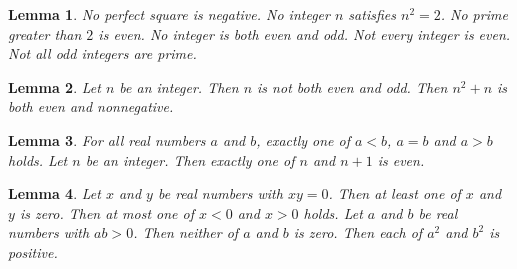 \documentclass{article}
\newtheorem{lemma}{Lemma}
\begin{document}
\begin{lemma}\label{no-and-not-every}
No perfect square is negative. No integer $n$ satisfies $n^2=2$. No prime greater than $2$ is even. No integer is both even and odd. Not every integer is even. Not all odd integers are prime.
\end{lemma}

\begin{lemma}\label{both-and-not-both}
Let $n$ be an integer. Then $n$ is not both even and odd. Then $n^2+n$ is both even and nonnegative.
\end{lemma}

\begin{lemma}\label{how-many-of}
For all real numbers $a$ and $b$, exactly one of $a<b$, $a=b$ and $a>b$ holds. Let $n$ be an integer. Then exactly one of $n$ and $n+1$ is even.
\end{lemma}

\begin{lemma}\label{how-many-of-terms}
Let $x$ and $y$ be real numbers with $xy=0$. Then at least one of $x$ and $y$ is zero. Then at most one of $x<0$ and $x>0$ holds. Let $a$ and $b$ be real numbers with $ab>0$. Then neither of $a$ and $b$ is zero. Then each of $a^2$ and $b^2$ is positive.
\end{lemma}
\end{document}
